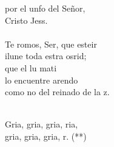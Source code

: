 \begin{cancion}
	por el unfo del Señor, \\
	Cristo Jess. \\
\jump\\
	Te romos, Ser, que esteir\\
	ilune toda estra osrid; \\
	que el lu mati\\
	lo encuentre arendo\\
	como no del reinado de la z.\\\jump\\
	\begin{chorus}%
	Gria, gria, gria, ria,\\
	gria, gria, gria, r. (**)\\
	\end{chorus}%
	\jump\\
\end{cancion}%
